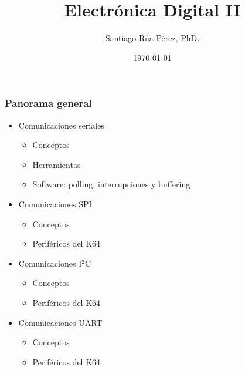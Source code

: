 \documentclass[10.5pt,scale=1.0,t,aspectratio=169,hyperref={pdfpagelabels=false}]{beamer}
\title{Electrónica Digital II}
\author{Santiago Rúa Pérez, PhD.}
\date{\today}
\begin{document}
	\begin{frame}
		\titlepage
	\end{frame}
	\frame{
		\begin{center}
			\LARGE \textcolor{blue}{COMUNICACIONES SERIALES}
		\end{center}
		
	}
	

\begin{frame}
\frametitle{Panorama general}
\begin{itemize}
\item Comunicaciones seriales
\begin{itemize}
	\item Conceptos
	\item Herramientas
	\item Software: polling, interrupciones y buffering
\end{itemize}
\item Comunicaciones SPI
\begin{itemize}
	\item Conceptos
	\item Periféricos del K64
\end{itemize}
\item Comunicaciones I$^2$C
\begin{itemize}
	\item Conceptos
	\item Periféricos del K64
\end{itemize}
\item Comunicaciones UART
\begin{itemize}
	\item Conceptos
	\item Periféricos del K64
\end{itemize}
\end{itemize}
\end{frame}
\end{document}
